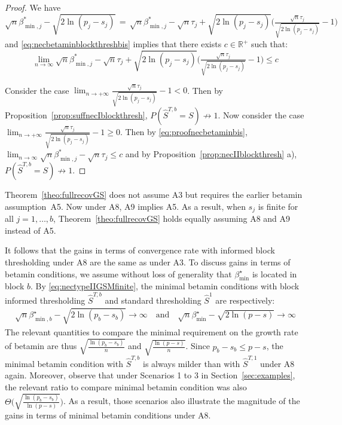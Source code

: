 \documentclass[aos]{imsart}
\theoremstyle{plain}
\newcommand{\R}{\mathbb{R}}
\begin{document}
\begin{supplement}
\begin{proof}
  We have $\sqrt{n}\beta_{\min,j}^*-\sqrt{2\ln(p_j-s_j)} \,=\, \sqrt{n}\beta_{\min,j}^*-\sqrt{n}\tau_j+\sqrt{2\ln(p_j-s_j)}\Big(\tfrac{\sqrt{n}\tau_j}{\sqrt{2\ln(p_j-s_j)}}-1\Big)$ and \eqref{eq:necbetaminblockthreshbis} implies that there exists $c\in\R^+$ such that:
  \begin{equation}\label{eq:proofnecbetaminbis}
      \lim_{n\to \infty}\sqrt{n}\beta_{\min,j}^*-\sqrt{n}\tau_j+\sqrt{2\ln(p_j-s_j)}\Big(\tfrac{\sqrt{n}\tau_j}{\sqrt{2\ln(p_j-s_j)}}-1\Big)\leq c
  \end{equation}

Consider the case $\lim_{n\to +\infty}\tfrac{\sqrt{n}\tau_j}{\sqrt{2\ln(p_j-s_j)}}-1<0$. Then by Proposition~\ref{prop:suffnecIblockthresh},
$P(\hat{S}^{T,b} = S)\not \to 1$. 
Now consider the case $\lim_{n\to +\infty}\tfrac{\sqrt{n}\tau_j}{\sqrt{2\ln(p_j-s_j)}}-1 \geq0$. Then by \eqref{eq:proofnecbetaminbis},  $\lim_{n\to \infty}\sqrt{n}\beta_{\min,j}^*-\sqrt{n}\tau_j \leq c$ and by Proposition~\ref{prop:necIIblockthresh} a), $P(\hat{S}^{T,b} = S)\not \to 1$.
\end{proof}

Theorem~\ref{theo:fullrecovGS} does not assume A3 but requires the earlier betamin assumption~A5. Now under A8, A9 implies A5. As a result, when $s_j$ is finite for all $j=1,\ldots,b$, Theorem~\ref{theo:fullrecovGS} holds equally assuming A8 and A9 instead of A5.

It follows that the gains in terms of convergence rate with  informed block thresholding under A8 are the same as under A3. To discuss gains in terms of betamin conditions, we assume without loss of generality that $\beta_{\min}^{\star}$ is located in block $b$. By \eqref{eq:nectypeIIGSMfinite}, the minimal betamin conditions with block informed thresholding $\hat{S}^{T,b}$ and standard thresholding $\hat{S}^1$ are respectively:
\begin{align}
    \sqrt{n}\beta_{\min,b}^{\star}-\sqrt{2\ln(p_b-s_b)} \to \infty \quad\text{and}\quad
    \sqrt{n}\beta_{\min}^{\star}-\sqrt{2\ln(p-s)} \to \infty
\end{align}
The relevant quantities to compare the minimal requirement on the growth rate of betamin are thus $\sqrt{\tfrac{\ln(p_b-s_b)}{n}}$ and $\sqrt{\tfrac{\ln(p-s)}{n}}$. Since $p_b-s_b \leq p - s$, the minimal betamin condition with $\hat{S}^{T,b}$ is always milder than with $\hat{S}^{T,1}$ under A8 again. Moreover, observe that under Scenarios 1 to 3 in Section~\ref{sec:examples}, the relevant ratio to compare minimal betamin condition was also $\Theta\Big(\sqrt{\tfrac{\ln(p_b-s_b)}{\ln(p-s)}}\Big)$. As a result, those scenarios also illustrate the magnitude of the gains in terms of minimal betamin conditions under A8.

\end{supplement}
\end{document}
